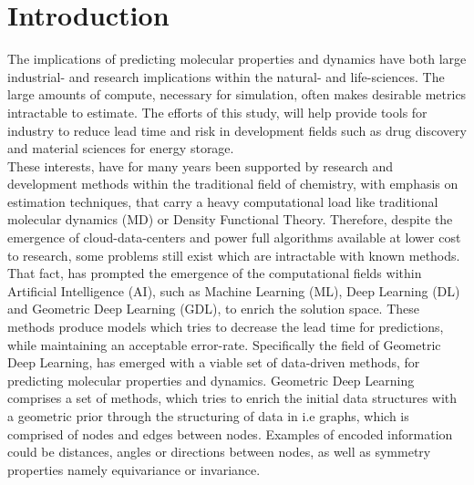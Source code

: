 \section{Introduction}\label{sec:intro}

The implications of predicting molecular properties and dynamics have both large industrial- and research implications within
the natural- and life-sciences. The large amounts of compute, necessary for simulation, often makes desirable metrics intractable
to estimate. The efforts of this study, will help provide tools for industry to reduce lead time and risk in development fields
such as drug discovery and material sciences for energy storage\cite{Busk2021}.  \\

These interests, have for many years been supported by research and development methods within
the traditional field of chemistry, with emphasis on estimation techniques, that carry a heavy computational load like traditional
molecular dynamics (MD)\cite{Behler2011} or Density Functional Theory\cite{Busk2021}. Therefore, despite the emergence of
cloud-data-centers and power full algorithms available at lower cost to research, some problems still exist which are intractable
with known methods.\\

That fact, has prompted the emergence of the computational fields within Artificial Intelligence (AI), such as Machine Learning (ML),
Deep Learning (DL) and Geometric Deep Learning (GDL), to enrich the solution space. These methods produce models which tries to
decrease the lead time for predictions, while maintaining an acceptable error-rate\cite{Gasteiger2020}. Specifically the field
of Geometric Deep Learning, has emerged with a viable set of data-driven methods, for predicting molecular properties and
dynamics\cite{Atz2021}. Geometric Deep Learning comprises a set of methods, which tries to enrich the initial data structures
with a geometric prior through the structuring of data in i.e graphs, which is comprised of nodes and edges
between nodes\cite{Atz2021}. Examples of encoded information could be distances, angles or directions between nodes,
as well as symmetry properties namely equivariance or invariance.\\

